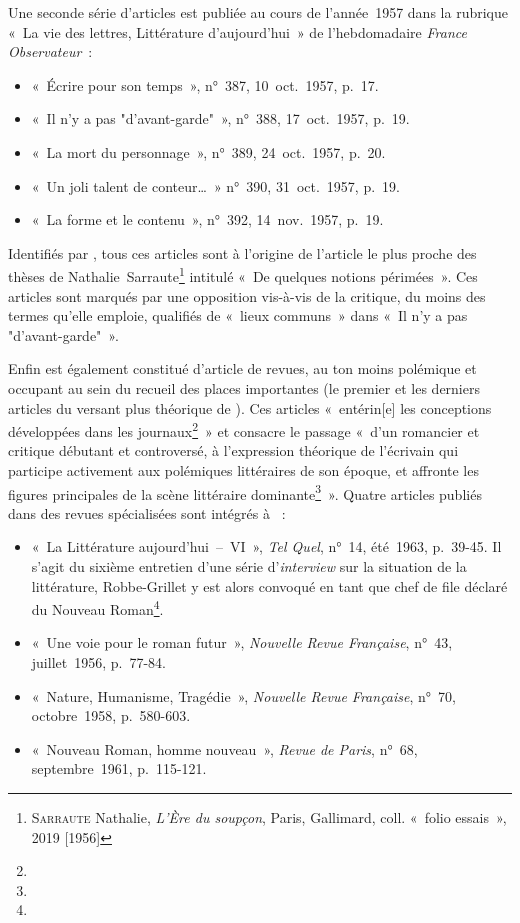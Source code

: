 \documentclass[12pt, a4paper]{article}
\begin{document}
Une seconde série d'articles est publiée au cours de l'année~1957 dans la rubrique «~La vie des lettres, Littérature d’aujourd’hui~» de l'hebdomadaire \textit{France Observateur}~:
\begin{itemize}
    \item «~Écrire pour son temps~», n°~387, 10~oct.~1957, p.~17.
    \item «~Il n’y a pas "d’avant-garde"~», n°~388, 17~oct.~1957, p.~19.
    \item «~La mort du personnage~», n°~389, 24~oct.~1957, p.~20.
    \item «~Un joli talent de conteur…~» n°~390, 31~oct.~1957, p.~19.
    \item «~La forme et le contenu~», n°~392, 14~nov.~1957, p.~19.
\end{itemize}
Identifiés par \galia, tous ces articles sont à l'origine de l'article le plus proche des thèses de Nathalie~Sarraute\footnote{\textsc{Sarraute} Nathalie, \textit{L'Ère du soupçon}, Paris, Gallimard, coll. «~folio essais~», 2019 [1956]} intitulé «~De quelques notions périmées~». Ces articles sont marqués par une opposition vis-à-vis de la critique, du moins des termes qu'elle emploie, qualifiés de «~lieux communs~» dans «~Il n’y a pas "d’avant-garde"~».

Enfin \punr{} est également constitué d'article de revues, au ton moins polémique et occupant au sein du recueil des places importantes (le premier et les derniers articles du versant plus théorique de \punr). Ces articles «~entérin[e] les conceptions développées dans les journaux\footnote{}~» et consacre le passage «~d’un romancier et critique débutant et controversé, à l’expression théorique de l’écrivain qui participe activement aux polémiques littéraires de son époque, et affronte les figures principales de la scène littéraire dominante\footnote{}~». Quatre articles publiés dans des revues spécialisées sont intégrés à \punr~:
\begin{itemize}
    \item «~La Littérature aujourd'hui~–~VI~», \textit{Tel Quel}, n°~14, été~1963, p.~39-45. Il s'agit du sixième entretien d'une série d'\textit{interview} sur la situation de la littérature, Robbe-Grillet y est alors convoqué en tant que chef de file déclaré du Nouveau Roman\footnote{}.
    \item «~Une voie pour le roman futur~», \textit{Nouvelle Revue Française}, n°~43, juillet~1956, p.~77-84.
    \item «~Nature, Humanisme, Tragédie~», \textit{Nouvelle Revue Française}, n°~70, octobre~1958, p.~580-603.
    \item «~Nouveau Roman, homme nouveau~», \textit{Revue de Paris}, n°~68, septembre~1961, p.~115-121.
\end{itemize}
\end{document}
